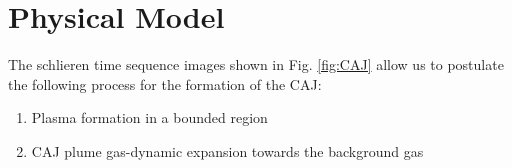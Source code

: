 \documentclass[a4paper]{iacas}%
\begin{document}
%
%
%
%
%

\section{Physical Model}\label{sec:physical_model}
The schlieren time sequence images shown in Fig. \ref{fig:CAJ} allow us to postulate the following process for the formation of the CAJ:
\begin{enumerate}
	\item Plasma formation in a bounded region
	\item CAJ plume gas-dynamic expansion towards the background gas
\end{enumerate}
\end{document}
